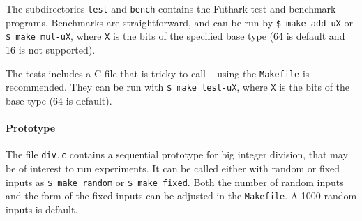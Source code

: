 The subdirectories \texttt{test} and \texttt{bench} contains the Futhark test
and benchmark programs. Benchmarks are straightforward, and can be run by
\texttt{\$ make add-uX} or \texttt{\$ make mul-uX}, where \texttt{X} is the bits
of the specified base type (64 is default and 16 is not supported).

The tests includes a C file that is tricky to call -- using the \texttt{Makefile}
is recommended. They can be run with \texttt{\$ make test-uX}, where \texttt{X}
is the bits of the base type (64 is default).

\paragraph{Prototype}
The file \texttt{div.c} contains a sequential prototype for big integer
division, that may be of interest to run experiments. It can be called either
with random or fixed inputs as \texttt{\$ make random} or \texttt{\$ make
  fixed}. Both the number of random inputs and the form of the fixed inputs can
be adjusted in the \texttt{Makefile}. A 1000 random inputs is default.

